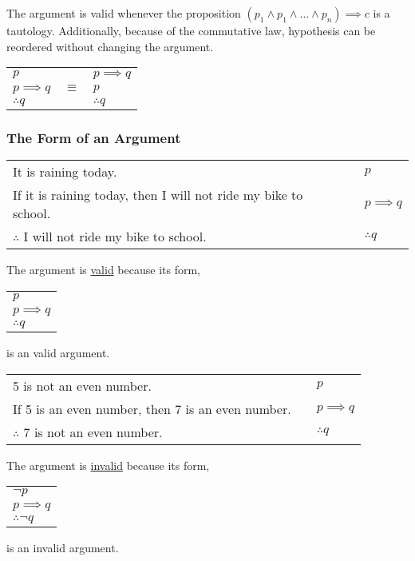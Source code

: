 The argument is valid whenever the proposition $(p_1 \land p_1 \land \dots \land p_n) \implies c$ is a tautology.
Additionally, because of the commutative law, hypothesis can be reordered without changing the argument.
\begin{center}
  \begin{tabular}{lcl}
    $p$            & \multirow{3}{*}{$\equiv$} & $p \implies q$ \\
    $p \implies q$ &                           & $p$            \\
    \hhline{-~-}
    $\therefore q$ &                           & $\therefore q$
  \end{tabular}
\end{center}

\subsubsection*{The Form of an Argument}

\begin{center}
  \begin{tabular}{lcl}
    It is raining today.                                            &  & $p$            \\
    If it is raining today, then I will not ride my bike to school. &  & $p \implies q$ \\
    \hhline{-~-}
    $\therefore$ I will not ride my bike to school.                 &  & $\therefore q$
  \end{tabular}

  The argument is \underline{valid} because its form,
  \begin{tabular}{l}
    $p$            \\
    $p \implies q$ \\
    \hline
    $\therefore q$
  \end{tabular}
  is an valid argument.

\end{center}

\begin{center}
  \begin{tabular}{lcl}
    5 is not an even number.                          &  & $p$            \\
    If 5 is an even number, then 7 is an even number. &  & $p \implies q$ \\
    \hhline{-~-}
    $\therefore$ 7 is not an even number.             &  & $\therefore q$
  \end{tabular}

  The argument is \underline{invalid} because its form,
  \begin{tabular}{l}
    $\lnot p$      \\
    $p \implies q$ \\
    \hline
    $\therefore \lnot q$
  \end{tabular}
  is an invalid argument.
\end{center}

